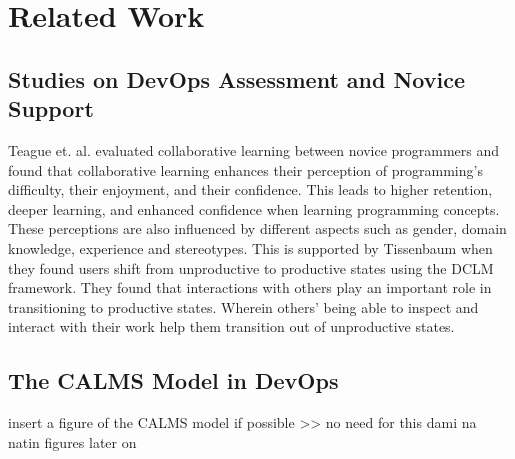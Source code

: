 \documentclass{sigchi}
\begin{document}
\section{Related Work}
\subsection{Studies on DevOps Assessment and Novice Support}
Teague et. al. \cite{teague2008collaborative} evaluated collaborative learning between novice programmers and found that collaborative learning enhances their perception of programming’s difficulty, their enjoyment, and their confidence. This leads to higher retention, deeper learning, and enhanced confidence when learning programming concepts. These perceptions are also influenced by different aspects such as gender, domain knowledge, experience and stereotypes. This is supported by Tissenbaum \cite{tissenbaum2020see} when they found users shift from unproductive to productive states using the DCLM framework. They found that interactions with others play an important role in transitioning to productive states. Wherein others’ being able to inspect and interact with their work help them transition out of unproductive states.









\subsection{The CALMS Model in DevOps}

insert a figure of the CALMS model if possible >> no need for this dami na natin figures later on


\end{document}
